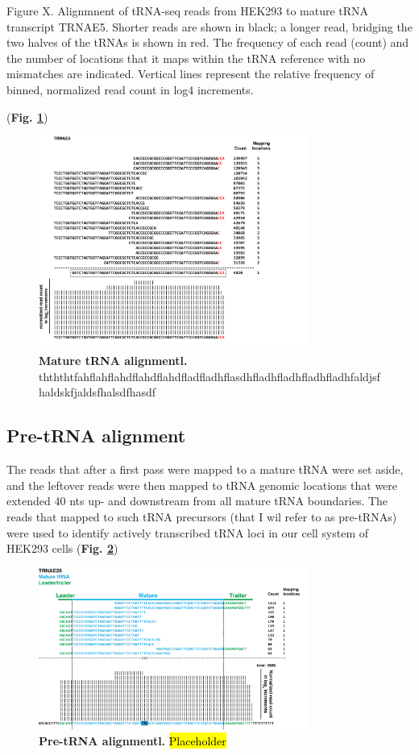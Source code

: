 \documentclass[12pt]{rockefeller}
\begin{document}
Figure X. Alignmnent of tRNA-seq reads from HEK293 to mature tRNA transcript TRNAE5. Shorter reads are shown in black; a longer read, bridging 
the two halves of the tRNAs is shown in red. The frequency of each read (count) and the number of locations that it maps within the tRNA reference with
no mismatches are indicated.  Vertical lines represent the relative frequency of binned, normalized read count in log4 increments.

(\textbf{Fig. \ref{mature}})

\begin{figure}[!ht]%
\centering
\includegraphics[width=3.5in]{mature.png}%
\caption[Mature tRNA alignment]{\textbf{Mature tRNA alignmentl.} thththtfahflahflahdflahdflahdfladfladhflasdhfladhfladhfladhfladhfaldjsfhaldskfjaldsfhalsdfhasdf}
\centering
\label{mature}%
\end{figure}

\subsection{Pre-tRNA alignment}
The reads that after a first pass were mapped to a mature tRNA were set aside, and the leftover reads were then mapped to tRNA genomic locations that were extended 40 nts up- and downstream from all mature tRNA boundaries. The reads that mapped to such tRNA precursors (that I wil refer to as pre-tRNAs) were used to identify actively transcribed tRNA loci in our cell system of HEK293 cells (\textbf{Fig. \ref{pre}})

\begin{figure}[!ht]%
\centering
\includegraphics[width=3.5in]{pre.png}%
\caption[Pre-tRNA alignment]{\textbf{Pre-tRNA alignmentl.} \hl{Placeholder}}
\centering
\label{pre}%
\end{figure}
\end{document}

